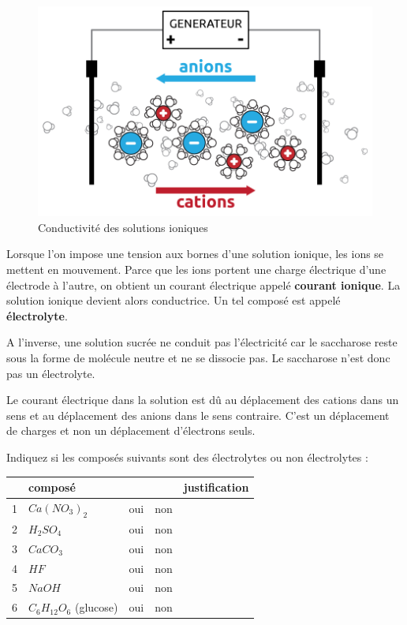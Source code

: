 \documentclass[
  11pt,
  a4paper,
  openany]{book}
\begin{document}
\begin{figure}

{\centering \includegraphics[width=0.5\linewidth]{images/electrolyte-2b} 

}

\caption{Conductivité des solutions ioniques}\label{fig:electrolyte-2b}
\end{figure}

Lorsque l'on impose une tension aux bornes d'une solution ionique, les ions se mettent en mouvement. Parce que les ions portent une charge électrique d'une électrode à l'autre, on obtient un courant électrique appelé \textbf{courant ionique}. La solution ionique devient alors conductrice. Un tel composé est appelé \textbf{électrolyte}.

A l'inverse, une solution sucrée ne conduit pas l'électricité car le saccharose reste sous la forme de molécule neutre et ne se dissocie pas. Le saccharose n'est donc pas un électrolyte.

Le courant électrique dans la solution est dû au déplacement des cations dans un sens et au déplacement des anions dans le sens contraire. C'est un déplacement de charges et non un déplacement d'électrons seuls.

\begin{Exercise}
Indiquez si les composés suivants sont des électrolytes ou non électrolytes :

\end{Exercise}

\begin{longtable}[]{@{}llccl@{}}
\toprule()
& composé & & & justification \\
\midrule()
\endhead
1 & \(Ca(NO_3)_2\) & oui & non & \\
2 & \(H_2SO_4\) & oui & non & \\
3 & \(CaCO_3\) & oui & non & \\
4 & \(HF\) & oui & non & \\
5 & \(NaOH\) & oui & non & \\
6 & \(C_6H_{12}O_6\) (glucose) & oui & non & \\
\bottomrule()
\end{longtable}
\end{document}
